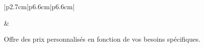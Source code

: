 \begin{justify}
\begin{spacing}{1.5}
\begin{longtable}{|p{2.7cm}|p{6.6cm}|p{6.6cm}|}
\begin{minipage}[t]{6.6cm}
                                    \vspace{0.1cm}
                                \end{minipage}
                                &
                                \begin{minipage}[t]{6.6cm}
                                     \justifying  Offre des prix personnalisés en fonction de vos besoins spécifiques.
                                \end{minipage}\\ 
                           \hline
    
                           \\
                        \hline
                        

\end{longtable}
\end{spacing}
\end{justify}
